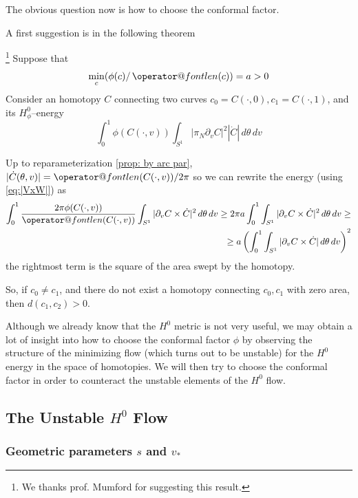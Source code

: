 \documentclass[twoside,a4paper,english]{article}
\makeatletter
\def\derpar#1{\partial_{#1}}
\def\len{\mathop{\operator@font len}\nolimits}
\def\v{{v_*}}
\makeatother
\begin{document}
The obvious question now is how to choose the conformal factor.

A first suggestion is in the following theorem
\begin{Proposition}\label{prop: conforme non deg}
\footnote{We thanks prof. Mumford for suggesting this result.}
  Suppose that 
  \begin{equation}
    \min_c(\phi(c)/\len(c))=a>0\label{eq:phinondeg}
  \end{equation}
  Consider an homotopy $C$ connecting two curves 
  $c_0=C(\cdot,0),c_1=C(\cdot,1)$,
  and its $H^0_\phi$--energy
  \[\int_0^1 \phi(C(\cdot,v))
  \int_{S^1}|\pi_N \derpar v C|^2 |\dot C| \, d\theta \,dv \] 

  Up to  reparameterization \ref{prop: by arc par},
  $|\dot C(\theta,v)|=\len(C(\cdot,v))/2\pi$ so we can
  rewrite the energy (using \eqref{eq:|VxW|}) as
  \begin{eqnarray*}
    \int_0^1\frac{ 2\pi \phi(C(\cdot,v))}{\len(C(\cdot,v))}
    \int_{S^1}|\derpar v C\times\dot C |^2 \, d\theta \,dv \ge 2\pi a
    \int_0^1 \int_{S^1}|\derpar v C\times\dot C |^2 \, d\theta \,dv \ge
    \\  \ge a \left(\int_0^1 \int_{S^1}|\derpar v C\times\dot C | \,
      d\theta \,dv \right)^2
  \end{eqnarray*}    
  the rightmost term is the square of the area swept by the
  homotopy.

  So, if $c_0\neq c_1$, and there do not exist a homotopy
  connecting $c_0,c_1$ with zero area, then $d(c_1,c_2)>0$. 
\end{Proposition}


Although
we already know that the $H^0$ metric is not very useful, we may obtain
a lot of insight into how to choose the conformal factor $\phi$ by
observing the structure of the minimizing flow (which turns out to
be unstable) for the $H^0$ energy in the space of homotopies. We will
then try to choose the conformal factor in order to counteract the
unstable elements of the $H^0$ flow.

\subsection{The Unstable $H^0$ Flow}

\subsubsection{Geometric parameters $s$ and $\v$}
\label{sec: geo par}
\end{document}
